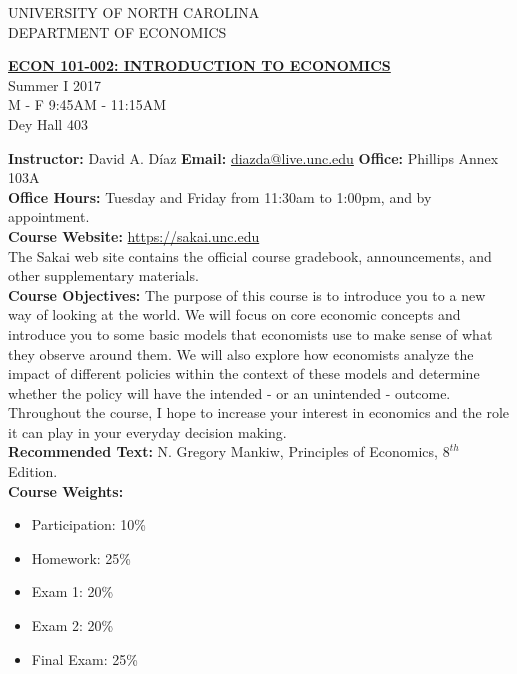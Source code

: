 \documentclass[11pt]{article}
\begin{document}
\begin{center} UNIVERSITY OF NORTH CAROLINA\\
DEPARTMENT OF ECONOMICS \\
\end{center}

\begin{center}\textbf{{\hspace{-.05in}}
\underline{ECON 101-002: INTRODUCTION TO ECONOMICS}}
\\ Summer I 2017
\\ M - F 9:45AM - 11:15AM
\\ Dey Hall 403
\end{center}


\textbf{Instructor:} David A. D\'iaz \hspace{4.5cm} \textbf{Email:} \url{diazda@live.unc.edu}
\textbf{Office:} Phillips Annex 103A \\
\textbf{Office Hours:} Tuesday and Friday from 11:30am to 1:00pm, and by appointment.\\
\textbf{Course Website:}
\href{https://sakai.unc.edu/portal/site/2c4d5bc8-5222-46ac-bcad-18681c7e9ce9}{https://sakai.unc.edu}\\
The Sakai web site contains the official course gradebook, announcements, and other supplementary materials.\\

\textbf{Course Objectives:} The purpose of this course is to introduce you to a new way of looking at the world. We will focus on core economic concepts and introduce you to some basic models that economists use to make sense of what they observe around them. We will also explore how economists analyze the impact of different policies within the context of these models and determine whether the policy will have the intended - or an unintended - outcome. Throughout the course, I hope to increase your interest in economics and the role it can play in your everyday decision making.
\\

\textbf{Recommended Text:} N. Gregory Mankiw, Principles of Economics, $8^{th}$ Edition.\\


\textbf{Course Weights:}
\begin{itemize}
	\item Participation: 10\%
	\item Homework: 25\%
	\item Exam 1: 	20\%
	\item Exam 2: 20\%
	\item	Final Exam: 25\% 
\end{itemize}
\end{document}
